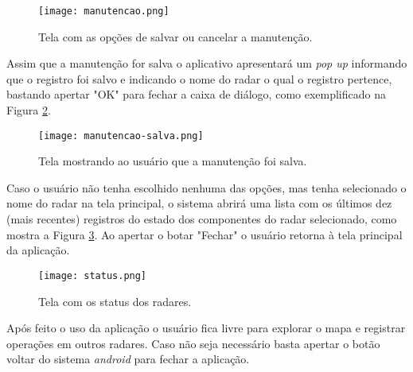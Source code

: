     \begin{figure}[H]
        \centering
        \texttt{[image: manutencao.png]}
        \caption{Tela com as opções de salvar ou cancelar a manutenção.}
        \label{fig:app-manutencao}
    \end{figure}

Assim que a manutenção for salva o aplicativo apresentará um \textit{pop up} informando que o registro foi salvo e indicando o nome do radar o qual o registro pertence, bastando apertar "OK" para fechar a caixa de diálogo, como exemplificado na Figura \ref{fig:app-salvo}.
    
    \begin{figure}[H]
        \centering
        \texttt{[image: manutencao-salva.png]}
\caption{Tela mostrando ao usuário que a manutenção foi salva.}
        \label{fig:app-salvo}
    \end{figure}

Caso o usuário não tenha escolhido nenhuma das opções, mas tenha selecionado o nome do radar na tela principal, o sistema abrirá uma lista com os últimos dez (mais recentes) registros do estado dos componentes do radar selecionado, como mostra a Figura \ref{fig:app-status}. Ao apertar o botar "Fechar" o usuário retorna à tela principal da aplicação.

    \begin{figure}[H]
        \centering
        \texttt{[image: status.png]}
        \caption{Tela com os status dos radares.}
        \label{fig:app-status}
    \end{figure}
    
Após feito o uso da aplicação o usuário fica livre para explorar o mapa e registrar operações em outros radares. Caso não seja necessário basta apertar o botão voltar do sistema \textit{android} para fechar a aplicação.
